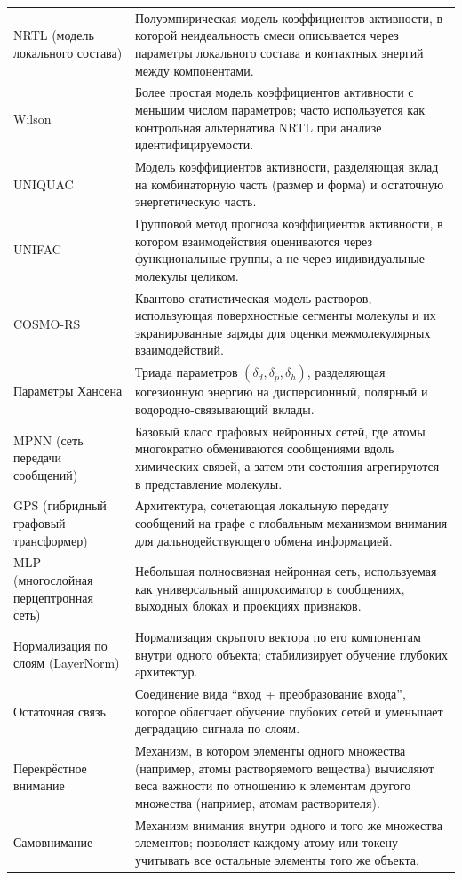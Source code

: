 \documentclass[11pt]{article}
\begin{document}
\begin{longtable}{p{}p{}}
NRTL (модель локального состава) & Полуэмпирическая модель коэффициентов активности, в которой неидеальность смеси описывается через параметры локального состава и контактных энергий между компонентами. \\
Wilson & Более простая модель коэффициентов активности с меньшим числом параметров; часто используется как контрольная альтернатива NRTL при анализе идентифицируемости. \\
UNIQUAC & Модель коэффициентов активности, разделяющая вклад на комбинаторную часть (размер и форма) и остаточную энергетическую часть. \\
UNIFAC & Групповой метод прогноза коэффициентов активности, в котором взаимодействия оцениваются через функциональные группы, а не через индивидуальные молекулы целиком. \\
COSMO-RS & Квантово-статистическая модель растворов, использующая поверхностные сегменты молекулы и их экранированные заряды для оценки межмолекулярных взаимодействий. \\
Параметры Хансена & Триада параметров $(\delta_d,\delta_p,\delta_h)$, разделяющая когезионную энергию на дисперсионный, полярный и водородно-связывающий вклады. \\
MPNN (сеть передачи сообщений) & Базовый класс графовых нейронных сетей, где атомы многократно обмениваются сообщениями вдоль химических связей, а затем эти состояния агрегируются в представление молекулы. \\
GPS (гибридный графовый трансформер) & Архитектура, сочетающая локальную передачу сообщений на графе с глобальным механизмом внимания для дальнодействующего обмена информацией. \\
MLP (многослойная перцептронная сеть) & Небольшая полносвязная нейронная сеть, используемая как универсальный аппроксиматор в сообщениях, выходных блоках и проекциях признаков. \\
Нормализация по слоям (LayerNorm) & Нормализация скрытого вектора по его компонентам внутри одного объекта; стабилизирует обучение глубоких архитектур. \\
Остаточная связь & Соединение вида ``вход + преобразование входа'', которое облегчает обучение глубоких сетей и уменьшает деградацию сигнала по слоям. \\
Перекрёстное внимание & Механизм, в котором элементы одного множества (например, атомы растворяемого вещества) вычисляют веса важности по отношению к элементам другого множества (например, атомам растворителя). \\
Самовнимание & Механизм внимания внутри одного и того же множества элементов; позволяет каждому атому или токену учитывать все остальные элементы того же объекта. \\

\end{longtable}
\end{document}
